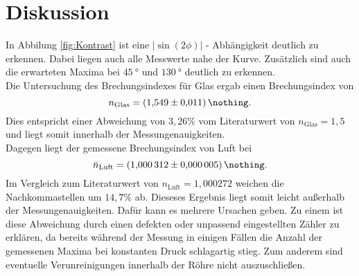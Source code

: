 \FloatBarrier
\newpage
\section{Diskussion}
In Abbilung \ref{fig:Kontrast} ist eine $|\sin{(2\phi)}|$ - Abhängigkeit deutlich zu erkennen.
Dabei liegen auch alle Messwerte nahe der Kurve.
Zusätzlich sind auch die erwarteten Maxima bei $\SI{45}{\degree}$ und $\SI{130}{\degree}$ deutlich zu erkennen. \\
Die Untersuchung des Brechungsindexes für Glas ergab einen Brechungsindex von
\begin{equation}
    n_\text{Glas} = \SI{1.549 \pm 0.011}{\nothing} .
\end{equation}
Dies entspricht einer Abweichung von $3,26 \%$ vom Literaturwert von $n_\text{Glas} = 1,5$ und liegt somit innerhalb der Messungenauigkeiten.  \\
Dagegen liegt der gemessene Brechungsindex von Luft bei
\begin{equation}
    \bar{n}_\text{Luft} = \SI{1.000312 \pm 0.000005}{\nothing} .
 \end{equation}
Im Vergleich  zum Literaturwert von $n_\text{Luft} = 1,000272$ \cite{spektrum} weichen die Nachkommastellen um $14,7 \%$ ab. Dieseses Ergebnis liegt somit leicht außerhalb der Messungenauigkeiten. Dafür kann es mehrere Ursachen geben. Zu einem ist diese Abweichung durch einen defekten oder unpassend eingestellten Zähler zu erklären, da bereits während der Messung in einigen Fällen die Anzahl der gemessenen Maxima bei konstanten Druck schlagartig stieg. Zum anderem sind eventuelle Verunreinigungen innerhalb der Röhre nicht auszuschließen.
